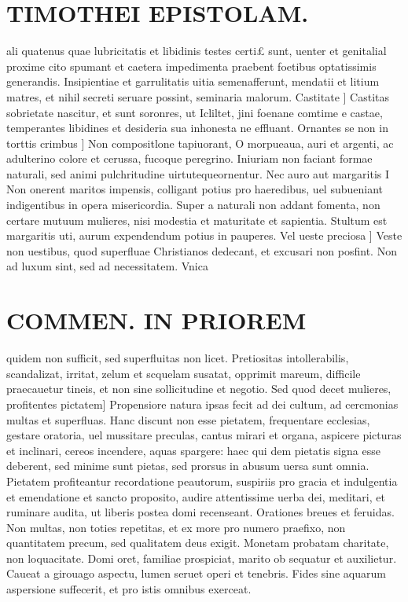\documentclass{article}
\begin{document}
\begin{pages}
\section*{TIMOTHEI EPISTOLAM. }
\marginpar{[ p.67 ]}\pstart ali quatenus quae lubricitatis et libidinis testes certi£ sunt, uenter et genitalial proxime cito spumant et caetera impedimenta praebent foetibus optatissimis generandis. Insipientiae et garrulitatis uitia semenafferunt, mendatii et litium matres, et nihil secreti seruare possint, seminaria malorum.  \pend\pstart Castitate ] Castitas sobrietate nascitur, et sunt soronres, ut Icliltet, jini foenane comtime e castae, temperantes libidines et desideria sua inhonesta ne effluant.  \pend\pstart Ornantes se non in torttis crimbus ] Non compositlone tapiuorant, O morpueaua, auri et argenti, ac adulterino colore et cerussa, fucoque  peregrino. Iniuriam non faciant formae naturali, sed animi pulchritudine uirtutequeornentur.  \pend\pstart Nec auro aut margaritis I Non onerent maritos impensis, colligant potius pro haeredibus, uel subueniant indigentibus in opera misericordia. Super a naturali non addant fomenta, non certare mutuum mulieres, nisi modestia et maturitate et sapientia. Stultum est margaritis uti, aurum expendendum potius in pauperes.  \pend\pstart Vel ueste preciosa ] Veste non uestibus, quod superfluae Christianos dedecant, et excusari non posfint. Non ad luxum sint, sed ad necessitatem. Vnica  \pend
\section*{COMMEN. IN PRIOREM }
\marginpar{[ p.48 ]}\pstart quidem non sufficit, sed superfluitas non licet. Pretiositas intollerabilis, scandalizat, irritat, zelum et scquelam susatat, opprimit mareum, difficile praecauetur tineis, et non sine sollicitudine et negotio.  \pend\pstart Sed quod decet mulieres, profitentes pictatem] Propensiore natura ipsas fecit ad dei cultum, ad cercmonias multas et superfluas. Hanc discunt non esse pietatem, frequentare ecclesias, gestare oratoria, uel mussitare preculas, cantus mirari et organa, aspicere picturas et inclinari, cereos incendere, aquas spargere: haec qui dem pietatis signa esse deberent, sed minime sunt pietas, sed prorsus in abusum uersa sunt omnia. Pietatem profiteantur recordatione peautorum, suspiriis pro gracia et indulgentia et emendatione et sancto proposito, audire attentissime uerba dei, meditari, et ruminare audita, ut liberis postea domi recenseant. Orationes breues et feruidas. Non multas, non toties repetitas, et ex more pro numero praefixo, non quantitatem precum, sed qualitatem deus exigit. Monetam probatam charitate, non loquacitate. Domi oret, familiae prospiciat, marito ob sequatur et auxilietur. Caueat a girouago aspectu, lumen seruet operi et tenebris. Fides sine aquarum aspersione suffecerit, et pro istis omnibus exerceat.  \pend

\end{pages}
\end{document}
